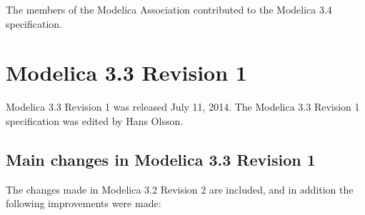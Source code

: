 \documentclass[10pt,a4paper]{report}
\def\doublelabel#1{\label{#1}}
\begin{document}
The members of the Modelica Association contributed to the Modelica 3.4
specification.

\section{Modelica 3.3 Revision 1}\doublelabel{modelica-3-3-revision-1}

Modelica 3.3 Revision 1 was released July 11, 2014. The Modelica 3.3
Revision 1 specification was edited by Hans Olsson.

\subsection{Main changes in Modelica 3.3 Revision 1}\doublelabel{main-changes-in-modelica-3-3-revision-1}
The changes made in Modelica 3.2 Revision 2 are included, and in
addition the following improvements were made:
\end{document}
